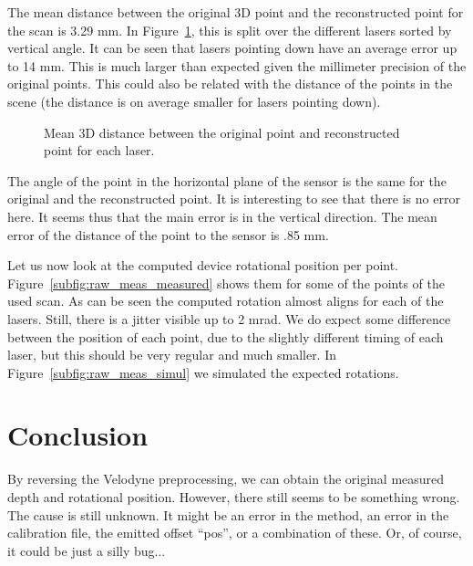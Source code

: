 \documentclass[english]{article}
\begin{document}
The mean distance between the original 3D point and the reconstructed point for
the scan is 3.29 mm. In Figure~\ref{fig:norms_error}, this is split over the
different lasers sorted by vertical angle. It can be seen that lasers pointing
down have an average error up to 14 mm. This is much larger than expected given
the millimeter precision of the original points. This could also be related with
the distance of the points in the scene (the distance is on average smaller for
lasers pointing down).

\begin{figure}
    \centering
    \def\svgwidth{\columnwidth}
    \scalebox{0.9}{
    \def\svgwidth{.6 \columnwidth}
      
    }
    \caption{Mean 3D distance between the original point and reconstructed point
    for each laser.}
		\label{fig:norms_error}
\end{figure}

The angle of the point in the horizontal plane of the sensor is the same for the
original and the reconstructed point. It is interesting to see that there is no
error here. It seems thus that the main error is in the vertical direction.  The
mean error of the distance of the point to the sensor is .85 mm.

Let us now look at the computed device rotational position per point.
Figure~\ref{subfig:raw_meas_measured} shows them for some of the points of the
used scan. As can be seen the computed rotation almost aligns for each of the
lasers. Still, there is a jitter visible up to 2 mrad. We do expect some
difference between the position of each point, due to the slightly different
timing of each laser, but this should be very regular and much smaller. In
Figure~\ref{subfig:raw_meas_simul} we simulated the expected rotations.

\section{Conclusion}
By reversing the Velodyne preprocessing, we can obtain the original measured
depth and rotational position. However, there still seems to be something wrong.
The cause is still unknown. It might be an error in the method, an error in the
calibration file, the emitted offset ``pos'', or a combination of these. Or, of
course, it could be just a silly bug...

%      
\end{document}
